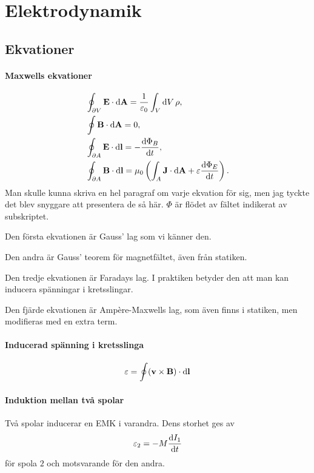\section{Elektrodynamik}

\subsection{Ekvationer}

\paragraph{Maxwells ekvationer}
\begin{align*}
	&\oint_{\partial V}\vect{E}\cdot\dd{\vect{A}} = \frac{1}{\varepsilon_0}\int_{V}\dd{V}\rho, \\
	&\oint\vect{B}\cdot\dd{\vect{A}} = 0, \\
	&\oint_{\partial A}\vect{E}\cdot\dd{\vect{l}} = -\dv{\Phi_{B}}{t}, \\
	&\oint_{\partial A}\vect{B}\cdot\dd{\vect{l}} = \mu_0\left(\int_{A}\vect{J}\cdot\dd{\vect{A}} + \varepsilon\dv{\Phi_{E}}{t}\right).
\end{align*}
Man skulle kunna skriva en hel paragraf om varje ekvation för sig, men jag tyckte det blev snyggare att presentera de så här. $\Phi$ är flödet av fältet indikerat av subskriptet.

Den första ekvationen är Gauss' lag som vi känner den.

Den andra är Gauss' teorem för magnetfältet, även från statiken.

Den tredje ekvationen är Faradays lag. I praktiken betyder den att man kan inducera spänningar i kretsslingar.

Den fjärde ekvationen är Ampère-Maxwells lag, som även finns i statiken, men modifieras med en extra term.

\paragraph{Inducerad spänning i kretsslinga}
\begin{align*}
	\varepsilon = \oint(\vect{v}\times\vect{B})\cdot\dd{\vect{l}}
\end{align*}

\deriv

\paragraph{Induktion mellan två spolar}
Två spolar inducerar en EMK i varandra. Dens storhet ges av
\begin{align*}
	\varepsilon_2 = -M\dv{I_1}{t}
\end{align*}
för spola $2$ och motsvarande för den andra.

